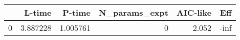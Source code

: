 \begin{tabular}{lrrrrr}
\toprule
{} &    L-time &    P-time &  N\_params\_expt &  AIC-like &  Eff \\
\midrule
0 &  3.887228 &  1.005761 &              0 &     2.052 & -inf \\
\bottomrule
\end{tabular}

